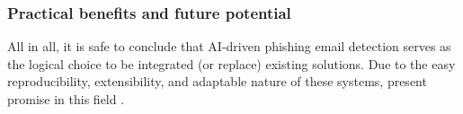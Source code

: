 
\subsubsection*{Practical benefits and future potential}
All in all, it is safe to conclude that AI-driven phishing email detection serves as the logical choice to be integrated (or replace) existing solutions. Due to the easy reproducibility, extensibility, and adaptable nature of these systems, present promise in this field \citep{bauskar2024ai}.

